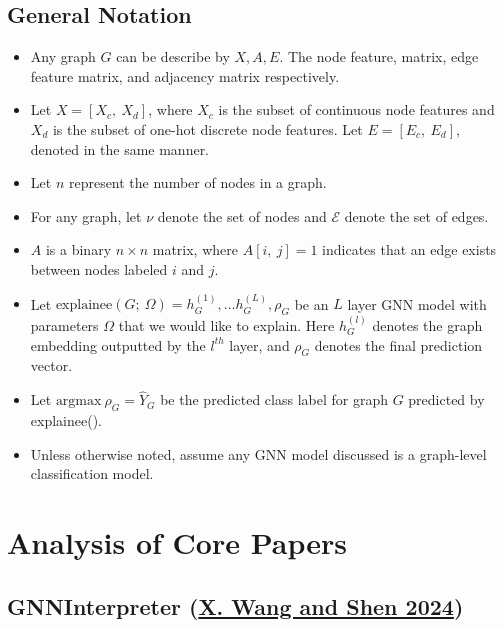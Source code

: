 \documentclass[
  11pt,
  letterpaper,
]{article}
\begin{document}
\hypertarget{general-notation}{%
\subsection{General Notation}\label{general-notation}}

\begin{itemize}
\item
  Any graph \(G\) can be describe by \(X, A, E\). The node feature,
  matrix, edge feature matrix, and adjacency matrix respectively.
\item
  Let \(X = [X_c, \ X_d]\), where \(X_c\) is the subset of continuous
  node features and \(X_d\) is the subset of one-hot discrete node
  features. Let \(E = [E_c, \ E_d]\), denoted in the same manner.
\item
  Let \(n\) represent the number of nodes in a graph.
\item
  For any graph, let \(\nu\) denote the set of nodes and \(\mathcal{E}\)
  denote the set of edges.
\item
  \(A\) is a binary \(n \times n\) matrix, where \(A[i, \ j] = 1\)
  indicates that an edge exists between nodes labeled \(i\) and \(j\).
\item
  Let
  \(\text{explainee}(G; \ \Omega) = h^{(1)}_G, \dots h^{(L)}_G, \rho_G\)
  be an \(L\) layer GNN model with parameters \(\Omega\) that we would
  like to explain. Here \(h^{(l)}_G\) denotes the graph embedding
  outputted by the \(l^{th}\) layer, and \(\rho_G\) denotes the final
  prediction vector.
\item
  Let \(\text{argmax} \ \rho_G = \hat Y_G\) be the predicted class label
  for graph \(G\) predicted by explainee().
\item
  Unless otherwise noted, assume any GNN model discussed is a
  graph-level classification model.
\end{itemize}

\hypertarget{analysis-of-core-papers}{%
\section{Analysis of Core Papers}\label{analysis-of-core-papers}}

\hypertarget{gnninterpreter-wang_shen_2024}{%
\subsection{\texorpdfstring{GNNInterpreter
(\protect\hyperlink{ref-Wang_Shen_2024}{X. Wang and Shen
2024})}{GNNInterpreter (X. Wang and Shen 2024)}}\label{gnninterpreter-wang_shen_2024}}
\end{document}
